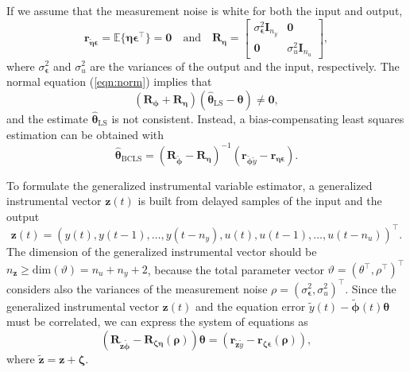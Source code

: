 If we assume that the measurement noise is white for both the input and output, 
\begin{equation}  \mathbf{r}_{\widetilde{\bm{\eta}} \bm{\epsilon}} = \mathbb{E}\{ \bm{\eta} \bm{\epsilon}^\top \} = \mathbf{0} \quad \mathrm{and} \quad \mathbf{R}_{\bm{\eta}} = \begin{bmatrix} \sigma_{\bm{\epsilon}}^2 \mathbf{I}_{n_y} & \mathbf{0} \\ \mathbf{0} & \sigma_u^2 \mathbf{I}_{n_u} \end{bmatrix}, \end{equation} 
 where $\sigma_{\bm{\epsilon}}^2$ and $\sigma_u^2$ are the variances of the output and the input, respectively. The normal equation (\ref{eqn:norm}) implies that 
\begin{equation} \left( \mathbf{R}_{\bm{\phi}} + \mathbf{R}_{\bm{\eta}} \right)  \left( \widehat{\bm{\theta}}_{\mathrm{LS}} - \bm{\theta} \right) \neq \mathbf{0}, \end{equation}
and the estimate $\widehat{\bm{\theta}}_{\mathrm{LS}}$ is not consistent.
Instead, a bias-compensating least squares estimation can be obtained with  
\begin{equation} \widehat{\bm{\theta}}_{\mathrm{BCLS}} = \left( \mathbf{R}_{\widetilde{\bm{\phi}}} - \mathbf{R}_{\bm{\eta}} \right)^{-1}  \left(  \mathbf{r}_{\widetilde{\bm{\phi}} \widetilde{y}} - \mathbf{r}_{\bm{\eta} \bm{\epsilon}} \right) . \end{equation}

To formulate the generalized instrumental variable estimator, a generalized instrumental vector $\mathbf{z}(t)$ is built from delayed samples of the input and the output 
\begin{equation*} \mathbf{z}(t) = \left( y(t), y(t-1), \ldots, y(t-n_y), u(t), u(t-1), \ldots, u(t-n_u) \right)^{\top} . \end{equation*}
The dimension of the generalized instrumental vector should be $n_{\mathbf{z}} \geq \mathrm{dim} ( \vartheta ) = n_u + n_y + 2$, because the total parameter vector $\vartheta = \left( \theta^\top, \rho^\top \right)^\top$ considers also the variances of the measurement noise $\rho = \left( \sigma_{\bm{\epsilon}}^2, \sigma_u^2 \right)^\top$. 
Since the generalized instrumental vector $\mathbf{z}(t)$ and the equation error $\widetilde{y}(t) - \widetilde{\bm{\phi}}(t) \bm{\theta}$ must be correlated, we can express the system of equations as 
\begin{equation} \left( \mathbf{R}_{\widetilde{\mathbf{z}} \widetilde{\bm{\phi}}} - \mathbf{R}_{\bm{\zeta} \bm{\eta}} \left( \bm{\rho} \right) \right) \bm{\theta} = \left(  \mathbf{r}_{\widetilde{\mathbf{z}} \widetilde{y}} - \mathbf{r}_{\bm{\zeta} \bm{\epsilon}} \left( \bm{\rho} \right) \right) , \label{eqn:GIVE} \end{equation}
where $\widetilde{\mathbf{z}} = \mathbf{z} + \bm{\zeta}$.

